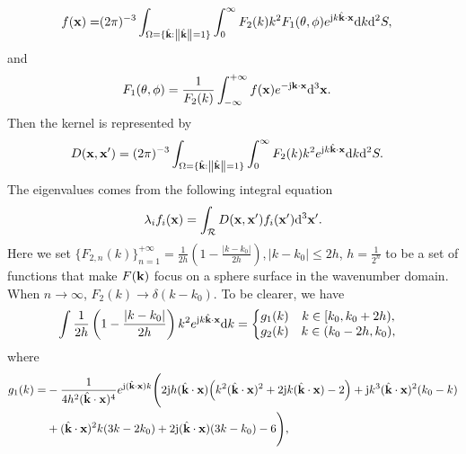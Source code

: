 \documentclass[12pt,draftclsnofoot,journal,onecolumn]{IEEEtran}
\begin{document}
	\begin{equation}
		\begin{aligned}
			f({\bf x})=&(2\pi)^{-3}\int_{{\Omega}=\{\hat{\bf k}: \left\| \hat{\bf k} \right\|=1\}}\int_{0}^{\infty}F_2(k)k^2F_1(\theta,\phi)e^{{\rm j}k\hat{\bf k}\cdot {\bf x}}{\rm d}k{\rm d}^2S,
		\end{aligned}
	\end{equation}
	and
	\begin{equation}
		\begin{aligned}
			F_1(\theta,\phi) &= 
			\frac{1}{F_2(k)} \int_{-\infty}^{+\infty}f({\bf x})e^{-{\rm j}{\bf k}\cdot {\bf x}}{\rm d}^3{\bf x}.
		\end{aligned}
	\end{equation}
	Then the kernel is represented by 
	\begin{equation}
		\begin{aligned}
			D({\bf x},{\bf x}') &= (2\pi)^{-3}\int_{{\Omega}=\{\hat{\bf k}: \left\| \hat{\bf k} \right\|=1\}}\int_{0}^{\infty}F_2(k)k^2e^{{\rm j}k\hat{\bf k}\cdot {\bf x}}{\rm d}k{\rm d}^2S.
		\end{aligned}
	\end{equation}
	The eigenvalues comes from the following integral equation
	\begin{equation}
		\lambda_i f_i({\bf x}) = \int_{\mathcal{R}}D({\bf x},{\bf x}')f_i({\bf x}'){\rm d}^3{\bf x}'.
		\label{eigenfunction_3d}
	\end{equation}
	Here we set $\{F_{2,n}(k)\}_{n=1}^{+\infty} = \frac{1}{2h}\left( 1-\frac{|k-k_0|}{2h} \right), |k-k_0|\leqslant 2h$, $h = \frac{1}{2^n}$ to be a set of functions that make $F({\bf k})$ focus on a sphere surface in the wavenumber domain. When $n \rightarrow \infty$, $F_2(k) \rightarrow \delta(k-k_0)$. To be clearer, we have
	 \begin{equation}
	 	\begin{aligned}
	 		&\int \frac{1}{2h}\left( 1-\frac{|k-k_0|}{2h} \right)k^2e^{{\rm j}k\hat{\bf k}\cdot {\bf x}}{\rm d}k
	 		= \left\{\begin{matrix}
	 		g_1(k)	& k \in [k_0,k_0+2h),\\
	 			g_2(k)	& k \in (k_0-2h,k_0),
	 		\end{matrix}\right.
	 	\end{aligned}
	 \end{equation}
	 where
	 \begin{equation}
	 	\begin{aligned}
	 		g_1(k) =& -\frac{1}{4 h^2 (\hat{\bf k}\cdot {\bf x})^4}e^{{\rm j} (\hat{\bf k}\cdot {\bf x}) k} \Bigg(2 {\rm j} h (\hat{\bf k}\cdot {\bf x}) \Big(k^2 (\hat{\bf k}\cdot {\bf x})^2+2 {\rm j} k (\hat{\bf k}\cdot {\bf x})-2\Big)+{\rm j} k^3 (\hat{\bf k}\cdot {\bf x})^2 (k_0-k)\\&+(\hat{\bf k}\cdot {\bf x})^2 k (3 k-2 k_0)+2 {\rm j} (\hat{\bf k}\cdot {\bf x}) (3 k-k_0)-6\Bigg),
		 \end{aligned}
     \end{equation}
\end{document}
